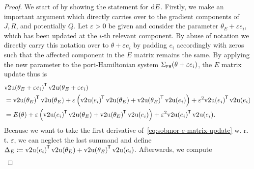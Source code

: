 

\begin{proof}

    We start of by showing the statement for $\mathop{}\!\mathrm{d} E$.
    Firstly, we make an important argument which directly carries over to the gradient components of $J, R$, and potentially $Q$.
    Let $\varepsilon > 0$ be given and consider the parameter $\theta_E + \varepsilon e_i$, which has been updated at the $i$-th relevant component.
    By abuse of notation we directly carry this notation over to $\theta + \varepsilon e_i$ by padding $e_i$ accordingly with zeros such that the affected component in the $E$ matrix remains the same.
    By applying the new parameter to the port-Hamiltonian system $\Sigma_{\textnormal{\scshape ph}}(\theta + \varepsilon e_i)$, the $E$ matrix update thus is
    \begin{equation}\label{eq:sobmor-e-matrix-update}
        \begin{aligned}
            &{\vecupper(\theta_E + \varepsilon e_i)}\trans \vecupper(\theta_E + \varepsilon e_i) \\
             &= {\vecupper(\theta_E)}\trans \vecupper(\theta_E) + \varepsilon \left( {\vecupper(e_i)}\trans \vecupper(\theta_E) + {\vecupper(\theta_E)}\trans \vecupper(e_i) \right) + \varepsilon^2 {\vecupper(e_i)}\trans \vecupper(e_i) \\
             &= E(\theta) + \varepsilon \left( {\vecupper(e_i)}\trans \vecupper(\theta_E) + {\vecupper(\theta_E)}\trans \vecupper(e_i) \right) + \varepsilon^2 {\vecupper(e_i)}\trans \vecupper(e_i).
        \end{aligned}
    \end{equation}
    Because we want to take the first derivative of~\eqref{eq:sobmor-e-matrix-update} w\@. r\@. t\@. $\varepsilon$, we can neglect the last summand and define $\Delta_E \coloneqq {\mathop{}\!\mathrm{v}2\mathrm{u}(e_i)}^{\mkern-1.5mu \mathsf{T}} \mathop{}\!\mathrm{v}2\mathrm{u}(\theta_E) + {\mathop{}\!\mathrm{v}2\mathrm{u}(\theta_E)}^{\mkern-1.5mu \mathsf{T}} \mathop{}\!\mathrm{v}2\mathrm{u}(e_i)$.
    Afterwards, we compute
    \begin{equation}\label{eq:sobmor-e-variation}
        \begin{aligned}

\end{aligned}
\end{equation}
\end{proof}
